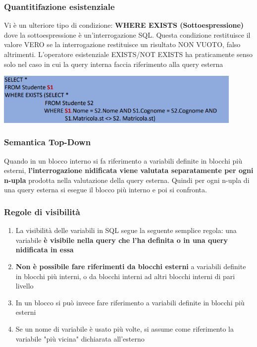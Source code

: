 \documentclass[12pt]{article}
\begin{document}
\subsubsection{Quantitifazione esistenziale}
Vi è un ulteriore tipo di condizione: \textbf{WHERE EXISTS (Sottoespressione)} \newline
dove la sottoespressione è un'interrogazione SQL.
Questa condizione restituisce il valore VERO se la interrogazione restituisce un risultato NON VUOTO, falso altrimenti.
L'operatore esistenziale EXISTS/NOT EXISTS ha praticamente senso solo nel caso in cui la query interna faccia riferimento alla query esterna
\begin{center}
    \includegraphics[width = 0.90\textwidth]{Images/224.PNG}
\end{center}
\subsubsection{Semantica Top-Down}
Quando in un blocco interno si fa riferimento a variabili definite in blocchi più esterni, \textbf{l'interrogazione nidificata viene valutata separatamente per ogni n-upla} prodotta nella valutazione della query esterna.
Quindi per ogni n-upla di una query esterna si esegue il blocco più interno e poi si confronta.
\subsubsection{Regole di visibilità}
\begin{enumerate}
    \item La visibilità delle variabili in SQL segue la seguente semplice regola: una variabile \textbf{è visibile nella query che l'ha definita o in una query nidificata in essa}
    \item \textbf{Non è possibile fare riferimenti da blocchi esterni} a variabili definite in blocchi più interni, o da blocchi interni ad altri blocchi interni di pari livello
    \item In un blocco si può invece fare riferimento a variabili definite in blocchi più esterni
    \item Se un nome di variabile è usato più volte, si assume come riferimento la variabile "più vicina" dichiarata all'esterno
\end{enumerate}
\end{document}
